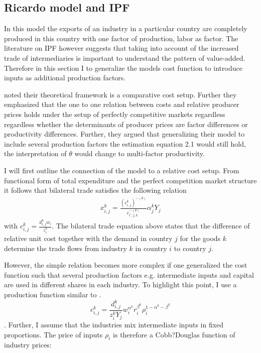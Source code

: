 \subsection{Ricardo model and IPF}
In this model the exports of an industry in a particular country are completely produced in this country with one factor of production, labor as factor. The literature on IPF however suggests that taking into account of the increased trade of intermediaries is important to understand the pattern of value-added. Therefore in this section I   to generalize the models cost function to introduce inputs as additional production factors. \par 
\textcite{costinot} noted their theoretical framework is a comparative cost setup. Further they emphasized that the one to one relation between costs and relative producer prices holds under the setup of perfectly competitive markets regardless regardless whether the determinants of producer prices are factor differences or productivity differences. Further, they argued that generalizing their model to include several production factors the estimation equation 2.1 would still hold, the interpretation of $\theta$ would change to multi-factor productivity.   \par  I will first outline the connection of the model to a relative cost setup. 
From  functional form of total expenditure and the perfect competition market structure it follows that bilateral trade satisfies the following relation \begin{align}
 x^k_{i,j}= \frac{(c^k_{i,j})^{ -(\theta) } } { c_{i',j,k}^{-(\theta) } }  \alpha^k_j Y_j 
\end{align} with $c^k_{i,j}=\frac{d^k_{i,j} w_i}{z_i^k}$.
 The bilateral trade equation above states that the difference of relative unit cost together with the demand in country $j$ for the goods $k$ determine the trade flows from industry $k$ in country $i$ to country $j$. 
 \par 
 However, the simple relation becomes more complex if one generalized the cost function such that several production factors e.g. intermediate inputs and capital are used in different shares in each industry. To highlight this point, I use a production function similar to \textcite{Shikher}.  \[ c^k_{i,j}=\frac{d^k_{i,j}}{z_{i}^k Y_j} w^{\alpha^k}_i r^{\beta^k}_i \rho^{1-\alpha^k-\beta^k}_{i} \]. Further, I assume that the industries mix intermediate inputs in fixed proportions. The price of inputs $\rho_i$ is therefore a Cobb?Douglas function of industry prices:
